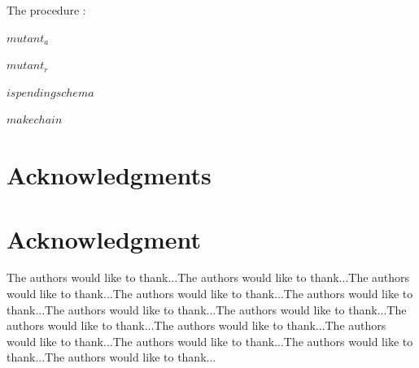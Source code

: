 \documentclass[10pt,journal,cspaper,compsoc]{IEEEtran}
\begin{document}
The procedure :

$mutant_a$

$mutant_r$

$is pending schema$

$makechain$


\ifCLASSOPTIONcompsoc
  \section*{Acknowledgments}
\else
  \section*{Acknowledgment}
\fi


The authors would like to thank...The authors would like to thank...The authors would like to thank...The authors would like to thank...The authors would like to thank...The authors would like to thank...The authors would like to thank...The authors would like to thank...The authors would like to thank...The authors would like to thank...The authors would like to thank...The authors would like to thank...The authors would like to thank...


\ifCLASSOPTIONcaptionsoff
  \newpage
\fi








%
%
%
\end{document}
